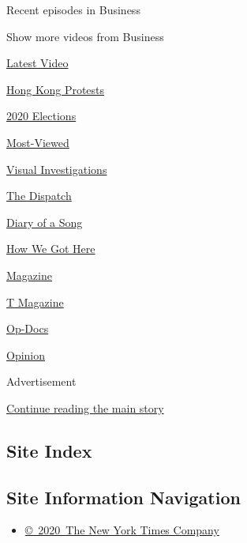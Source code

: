 Recent episodes in Business

Show more videos from Business

\href{/video}{}

\href{/video/latest-video}{Latest Video}

\href{/video/hk-protest}{Hong Kong Protests}

\href{/video/2020-Elections}{2020 Elections}

\href{/video/Most-Viewed}{Most-Viewed}

\href{/video/investigations}{Visual Investigations}

\href{/video/on-the-ground}{The Dispatch}

\href{/video/diaryofasong}{Diary of a Song}

\href{/video/how-we-got-here}{How We Got Here}

\href{/video/magazine}{Magazine}

\href{/video/t-magazine}{T Magazine}

\href{/video/op-docs}{Op-Docs}

\href{/video/opinion}{Opinion}

Advertisement

\protect\hyperlink{after-bottom}{Continue reading the main story}

\hypertarget{site-index}{%
\subsection{Site Index}\label{site-index}}

\hypertarget{site-information-navigation}{%
\subsection{Site Information
Navigation}\label{site-information-navigation}}

\begin{itemize}
\tightlist
\item
  \href{https://help.nytimes3xbfgragh.onion/hc/en-us/articles/115014792127-Copyright-notice}{©~2020~The
  New York Times Company}
\end{itemize}

